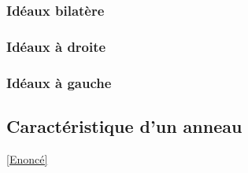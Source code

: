 \documentclass[8pt]{book}
\begin{document}
	
	\subsubsection{Idéaux bilatère}
	
	
	\subsubsection{Idéaux à droite}
	
	
	\subsubsection{Idéaux à gauche}
	
	
	\subsection{Caractéristique d'un anneau}
	\label{Caractéristique d'un anneau corrigé}
	\textcolor{blue}{\hyperref[Caractéristique d'un anneau]{[Enoncé]}}\\
\end{document}
